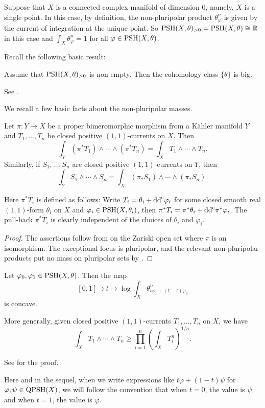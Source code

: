 \begin{remark}\label{rmk:npp:L275}
    Suppose that $X$ is a connected complex manifold of dimension $0$, namely, $X$ is a single point. In this case, by definition, the non-pluripolar product $\theta_{\varphi}^n$ is given by the current of integration at the unique point. So $\mathrm{PSH}(X,\theta)_{>0}=\mathrm{PSH}(X,\theta)\cong \mathbb{R}$ in this case and $\int_X \theta_{\varphi}^n=1$ for all $\varphi\in \mathrm{PSH}(X,\theta)$.
\end{remark}

Recall the following basic result:
\begin{proposition}\label{prop:nppposimpbig}
    Assume that $\mathrm{PSH}(X,\theta)_{>0}$ is non-empty. Then the cohomology class $\{\theta\}$ is big.
\end{proposition}
See \cite[Proposition~1.22]{BEGZ10}.

We recall a few basic facts about the non-pluripolar masses.
\begin{proposition}\label{prop:nppmassinv}
    Let $\pi\colon Y\rightarrow X$ be a proper bimeromorphic morphism from a K\"ahler manifold $Y$ and $T_1,\ldots,T_n$ be closed positive $(1,1)$-currents on $X$. Then
    \[
        \int_Y (\pi^*T_1)\wedge \cdots \wedge (\pi^*T_n)=\int_X T_1\wedge \cdots \wedge T_n.
    \]
    Similarly, if $S_1,\ldots,S_n$ are closed positive $(1,1)$-currents on $Y$, then
    \[
        \int_Y S_1\wedge \cdots \wedge S_n=\int_X \left(\pi_*S_1\right)\wedge \cdots \wedge \left(\pi_*S_n\right).
    \]
\end{proposition}
Here $\pi^*T_i$ is defined as follows: Write $T_i=\theta_i+\mathrm{dd}^{\mathrm{c}} \varphi_i$ for some closed smooth real $(1,1)$-form $\theta_i$ on $X$ and $\varphi_i\in \mathrm{PSH}(X,\theta_i)$, then $\pi^*T_i=\pi^*\theta_i+\mathrm{dd}^{\mathrm{c}} \pi^*\varphi_i$. The pull-back $\pi^*T_i$ is clearly independent of the choices of $\theta_i$ and $\varphi_i$.
\begin{proof}
    The assertions follow from  on the Zariski open set where $\pi$ is an isomorphism. The exceptional locus is pluripolar, and the relevant non-pluripolar products put no mass on pluripolar sets by .
\end{proof}

\begin{theorem}\label{thm:logconc}
    Let $\varphi_0,\varphi_1\in \mathrm{PSH}(X,\theta)$. Then the map
    \[
    [0,1] \ni t\mapsto \log\int_X \theta_{t\varphi_1+(1-t)\varphi_0}^n
    \]
    is concave. 
    
    More generally, given closed positive $(1,1)$-currents $T_1,\ldots,T_n$ on $X$, we have
    \[
        \int_X T_1\wedge \cdots \wedge T_n\geq \prod_{i=1}^n \left( \int_X T_i^n \right)^{1/n}.
    \]
\end{theorem}
See \cite{DDNL19log} for the proof.
\begin{remark}\label{rmk:linearcompsh}
    Here and in the sequel, when we write expressions like $t\varphi+(1-t)\psi$ for $\varphi,\psi\in \mathrm{QPSH}(X)$, we will follow the convention that when $t=0$, the value is $\psi$ and when $t=1$, the value is $\varphi$.
\end{remark}

